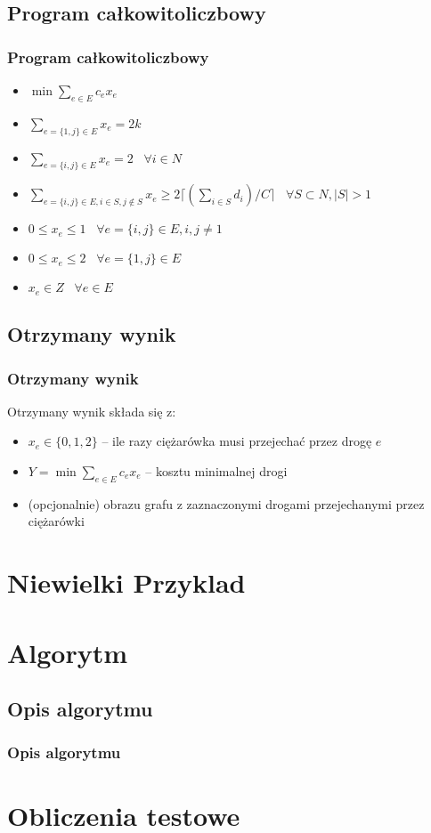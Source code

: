 \documentclass{beamer}
\begin{document}
\subsection{Program całkowitoliczbowy}
\begin{frame}
\frametitle{Program całkowitoliczbowy}
\begin{itemize}
    \item[] $\displaystyle \min \sum_{e \in E} c_e x_e$
    \item[] $\displaystyle \sum_{e=\{1,j\} \in E} x_e = 2k$
    \item[] $\displaystyle \sum_{e=\{i,j\} \in E} x_e = 2 \;\;\; \forall i \in N$
    \item[] $\displaystyle \sum_{e=\{i,j\} \in E, i \in S, j \not\in S} x_e \geq 2\lceil (\sum_{i\in S} d_i)/C \rceil \;\;\; \forall S \subset N, |S| > 1$
    \item[] $\displaystyle 0 \leq x_e \leq 1 \;\;\; \forall e = \{i,j\} \in E, i,j \neq 1$
    \item[] $\displaystyle 0 \leq x_e \leq 2 \;\;\; \forall e = \{1,j\} \in E$
    \item[] $\displaystyle x_e \in Z \;\;\; \forall e \in E$
\end{itemize}
\end{frame}

\subsection{Otrzymany wynik}
\begin{frame}
\frametitle{Otrzymany wynik}
Otrzymany wynik składa się z:
\begin{itemize}
    \item $x_e \in \{0,1,2\}$ -- ile razy ciężarówka musi przejechać przez drogę $e$
    \item $Y = \min \sum_{e \in E} c_e x_e$ -- kosztu minimalnej drogi
    \item (opcjonalnie) obrazu grafu z zaznaczonymi drogami przejechanymi przez ciężarówki
\end{itemize}
\end{frame}
\section{Niewielki Przyklad}
\section{Algorytm}
\begin{frame}
\subsection{Opis algorytmu}
\frametitle{Opis algorytmu}
\end{frame}
\section{Obliczenia testowe}
\end{document}
